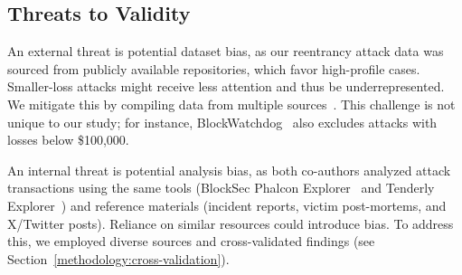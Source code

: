 \subsection{Threats to Validity}

An external threat is potential dataset bias, as our reentrancy attack data was sourced from publicly available repositories, which favor high-profile cases. Smaller-loss attacks might receive less attention and thus be underrepresented. We mitigate this by compiling data from multiple sources~\cite{reentrancy-list-pcaversaccio, blocksec-security-incidents, slowmist-hacked}. This challenge is not unique to our study; for instance, BlockWatchdog~\cite{turn-the-rudder} also excludes attacks with losses below \$100,000.

 An internal threat is potential analysis bias, as both co-authors analyzed attack transactions using the same tools (BlockSec Phalcon Explorer~\cite{blocksec-security-incidents} and Tenderly Explorer~\cite{tenderly}) and reference materials (incident reports, victim post-mortems, and X/Twitter posts).  Reliance on similar resources could introduce bias.  To address this, we employed diverse sources and cross-validated findings (see Section~\ref{methodology:cross-validation}).
